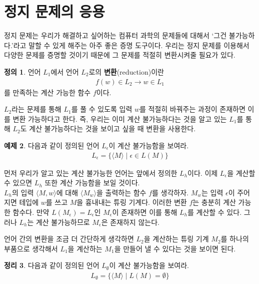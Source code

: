 \documentclass[b5paper, 10pt]{book}
\theoremstyle{definition}
\newtheorem{defn}{정의}[chapter]
\newtheorem{thm}[defn]{정리}
\newtheorem{ex}[defn]{예제}
\newenvironment{pf*}{\pushQED{\qed}\pf}{\popQED\endpf}
\begin{document}
\section{정지 문제의 응용}
정지 문제는 우리가 해결하고 싶어하는 컴퓨터 과학의 문제들에 대해서 `그건 불가능하다.'라고 말할 수 있게
해주는 아주 좋은 증명 도구이다. 우리는 정지 문제를 이용해서 다양한 문제를 증명할 것이기 때문에
그 문제를 적절히 변환시켜줄 필요가 있다.
\begin{defn}
    언어 $L_1$에서 언어 $L_2$로의 \textbf{변환}(reduction)이란 
    \begin{align*}
        f(w) \in L_2 \rightarrow w \in L_1 
    \end{align*}
    를 만족하는 계산 가능한 함수 $f$이다.
\end{defn}
$L_2$라는 문제를 통해 $L_1$를 풀 수 있도록 입력 $w$를 적절히 바꿔주는 과정이 존재하면
이를 변환 가능하다고 한다. 즉, 우리는 이미 계산 불가능하다는 것을 알고 있는 $L_1$를 통해
$L_2$도 계산 불가능하다는 것을 보이고 싶을 때 변환을 사용한다. 
\begin{ex}
    다음과 같이 정의된 언어 $L_\epsilon$이 계산 불가능함을 보여라.
    \begin{align*}
        L_\epsilon = \{ \langle M \rangle \;\vert\; \epsilon \in L(M) \}
    \end{align*}
\end{ex}
\begin{pf*}
    먼저 우리가 알고 있는 계산 불가능한 언어는 앞에서 정의한 $L_h$이다. 이제 $L_\epsilon$을
    계산할 수 있으면 $L_h$ 또한 계산 가능함을 보일 것이다. 
    \\ $L_h$의 입력 $\langle M , w\rangle$에 대해 $\langle M_w \rangle$을 출력하는 
    함수 $f$를 생각하자. $M_w$는 입력 $\epsilon$이 주어지면 테입에 $w$를 쓰고 
    $M$을 흉내내는 튜링 기계다. 이러한 변환 $f$는 충분히 계산 가능한 함수다. 
    만약 $L(M_\epsilon) = L_\epsilon$인 $M_\epsilon$이 존재하면 이를 통해 
    $L_h$를 계산할 수 있다. 그러나 $L_h$는 계산 불가능하므로 $M_\epsilon$은 존재하지
    않는다.
\end{pf*}
언어 간의 변환을 조금 더 간단하게 생각하면 $L_2$을 계산하는 튜링 기계 $M_2$를 하나의 
부품으로 생각해서 $L_1$을 계산하는 $M_1$을 만들어 낼 수 있다는 것을 보이면 된다.
\begin{thm}
    다음과 같이 정의된 언어 $L_\emptyset$이 계산 불가능함을 보여라.
    \begin{align*}
        L_\emptyset = \{ \langle M \rangle \;\vert\; L(M) = \emptyset \}
    \end{align*}
\end{thm}
\end{document}
